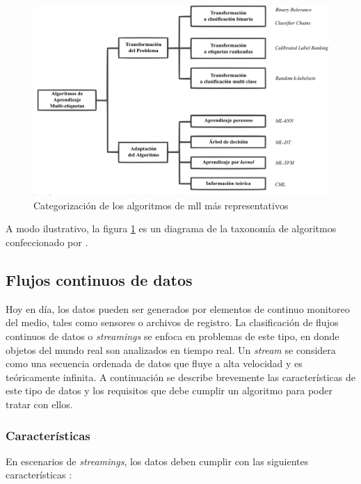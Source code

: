 \begin{figure}
   \includegraphics[width=\linewidth]{figures/algorithm_taxonomy.png}
   \caption{Categorización de los algoritmos de \acrshort{mll} más representativos}
   \label{fig:algorithm_taxonomy} 
\end{figure}

A modo ilustrativo, la figura \ref{fig:algorithm_taxonomy} es un diagrama de la
taxonomía de algoritmos confeccionado por \citeauthor{zhang_review_2014} \cite
{zhang_review_2014}.

\subsection{Flujos continuos de datos}
\label{flujos_continuos_datos}

Hoy en día, los datos pueden ser generados por elementos de continuo monitoreo
del medio, tales como sensores o archivos de registro.  La clasificación de
flujos continuos de datos o \textit{streamings} se enfoca en problemas de este
tipo, en donde objetos del mundo real son analizados en tiempo real. Un
\textit{stream} se considera como una secuencia ordenada de datos que fluye a
alta velocidad y es teóricamente infinita. A continuación se describe brevemente
las características de este tipo de datos y los requisitos que debe cumplir un
algoritmo para poder tratar con ellos.

\subsubsection{Características}
\label{stream_caracteristicas}

En escenarios de \textit{streamings}, los datos deben cumplir con las siguientes
características \cite {gama_knowledge_2010}: 

